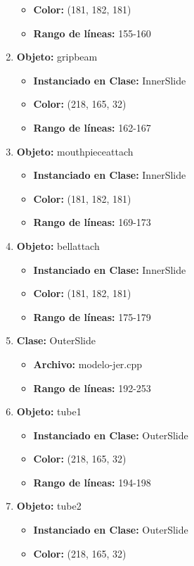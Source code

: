 \documentclass[10pt, a4paper]{article}
\begin{document}
\begin{enumerate}
\begin{itemize}
		\item \textbf{Color:} (181, 182, 181)
		\item \textbf{Rango de líneas:} 155-160
	\end{itemize}
	\item \textbf{Objeto:} gripbeam
	\begin{itemize}
		\item \textbf{Instanciado en Clase:} InnerSlide
		\item \textbf{Color:} (218, 165, 32)
		\item \textbf{Rango de líneas:} 162-167
	\end{itemize}
	\item \textbf{Objeto:} mouthpieceattach
	\begin{itemize}
		\item \textbf{Instanciado en Clase:} InnerSlide
		\item \textbf{Color:} (181, 182, 181)
		\item \textbf{Rango de líneas:} 169-173
	\end{itemize}
	\item \textbf{Objeto:} bellattach
	\begin{itemize}
		\item \textbf{Instanciado en Clase:} InnerSlide
		\item \textbf{Color:} (181, 182, 181)
		\item \textbf{Rango de líneas:} 175-179
	\end{itemize}
	\item \textbf{Clase:} OuterSlide 
	\begin{itemize}
		\item \textbf{Archivo:} modelo-jer.cpp
		\item \textbf{Rango de líneas:} 192-253
	\end{itemize}
	\item \textbf{Objeto:} tube1
	\begin{itemize}
		\item \textbf{Instanciado en Clase:} OuterSlide
		\item \textbf{Color:} (218, 165, 32)
		\item \textbf{Rango de líneas:} 194-198
	\end{itemize}
	\item \textbf{Objeto:} tube2
	\begin{itemize}
		\item \textbf{Instanciado en Clase:} OuterSlide
		\item \textbf{Color:} (218, 165, 32)

\end{itemize}
\end{enumerate}
\end{document}
